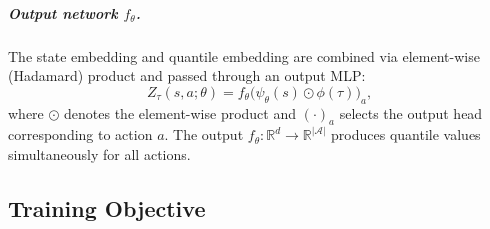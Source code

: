 \documentclass[11pt]{article}
\begin{document}
\subparagraph{Output network $f_\theta$.} The state embedding and quantile embedding are combined via element-wise (Hadamard) product and passed through an output MLP:
\begin{equation}\label{eq:iqn_output}
    Z_\tau(s,a;\theta) = f_\theta\bigl(\psi_\theta(s) \odot \phi(\tau)\bigr)_a,
\end{equation}
where $\odot$ denotes the element-wise product and $(\cdot)_a$ selects the output head corresponding to action $a$. The output $f_\theta : \mathbb{R}^d \to \mathbb{R}^{|\mathcal{A}|}$ produces quantile values simultaneously for all actions.
 

\subsection*{Training Objective}
\end{document}
